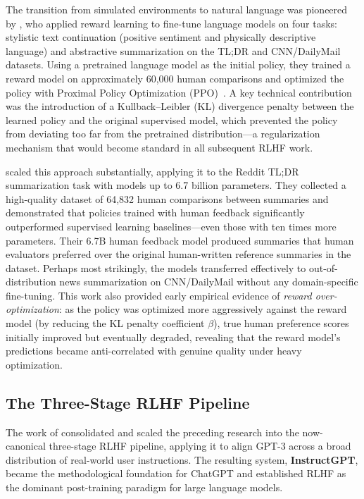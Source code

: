 The transition from simulated environments to natural language was pioneered by \cite{ziegler2019finetuning}, who applied reward learning to fine-tune language models on four tasks: stylistic text continuation (positive sentiment and physically descriptive language) and abstractive summarization on the TL;DR and CNN/DailyMail datasets. Using a pretrained language model as the initial policy, they trained a reward model on approximately 60,000 human comparisons and optimized the policy with Proximal Policy Optimization (PPO)~\cite{schulman2017ppo}. A key technical contribution was the introduction of a Kullback--Leibler (KL) divergence penalty between the learned policy and the original supervised model, which prevented the policy from deviating too far from the pretrained distribution---a regularization mechanism that would become standard in all subsequent RLHF work.

\cite{stiennon2020learning} scaled this approach substantially, applying it to the Reddit TL;DR summarization task with models up to 6.7 billion parameters. They collected a high-quality dataset of 64,832 human comparisons between summaries and demonstrated that policies trained with human feedback significantly outperformed supervised learning baselines---even those with ten times more parameters. Their 6.7B human feedback model produced summaries that human evaluators preferred over the original human-written reference summaries in the dataset. Perhaps most strikingly, the models transferred effectively to out-of-distribution news summarization on CNN/DailyMail without any domain-specific fine-tuning. This work also provided early empirical evidence of \emph{reward over-optimization}: as the policy was optimized more aggressively against the reward model (by reducing the KL penalty coefficient $\beta$), true human preference scores initially improved but eventually degraded, revealing that the reward model's predictions became anti-correlated with genuine quality under heavy optimization.

\subsection{The Three-Stage RLHF Pipeline}

The work of \cite{ouyang2022instructgpt} consolidated and scaled the preceding research into the now-canonical three-stage RLHF pipeline, applying it to align GPT-3 across a broad distribution of real-world user instructions. The resulting system, \textbf{InstructGPT}, became the methodological foundation for ChatGPT and established RLHF as the dominant post-training paradigm for large language models.


